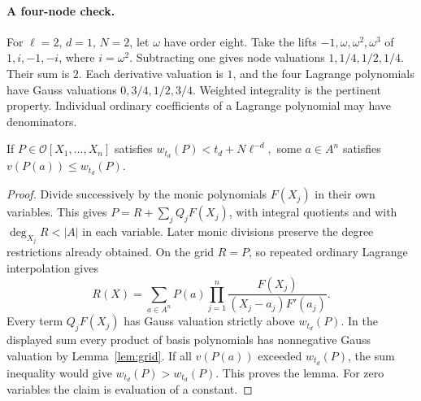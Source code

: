 \documentclass[11pt]{article}
\newcommand{\cO}{\mathcal O}\newcommand{\Tr}{\operatorname{tr}}
\begin{document}
\paragraph{A four-node check.} For $\ell=2$, $d=1$, $N=2$, let $\omega$ have order eight. Take the lifts $-1,\omega,\omega^2,\omega^3$ of $1,i,-1,-i$, where $i=\omega^2$. Subtracting one gives node valuations $1,1/4,1/2,1/4$. Their sum is $2$. Each derivative valuation is $1$, and the four Lagrange polynomials have Gauss valuations $0,3/4,1/2,3/4$. Weighted integrality is the pertinent property. Individual ordinary coefficients of a Lagrange polynomial may have denominators.

\begin{lemma}\label{lem:tensor}
If $P\in\cO[X_1,\ldots,X_n]$ satisfies
\(
 w_{t_d}(P)<t_d+N\ell^{-d},
\)
some $a\in A^n$ satisfies $v(P(a))\le w_{t_d}(P)$.
\end{lemma}
\begin{proof}
Divide successively by the monic polynomials $F(X_j)$ in their own variables. This gives $P=R+\sum_j Q_j F(X_j)$, with integral quotients and with $\deg_{X_j} R<|A|$ in each variable. Later monic divisions preserve the degree restrictions already obtained. On the grid $R=P$, so repeated ordinary Lagrange interpolation gives
\[
 R(X)=\sum_{a\in A^n}P(a)\prod_{j=1}^n
       \frac{F(X_j)}{(X_j-a_j)F'(a_j)}.
\]
Every term $Q_j F(X_j)$ has Gauss valuation strictly above $w_{t_d}(P)$. In the displayed sum every product of basis polynomials has nonnegative Gauss valuation by Lemma~\ref{lem:grid}. If all $v(P(a))$ exceeded $w_{t_d}(P)$, the sum inequality would give $w_{t_d}(P)>w_{t_d}(P)$. This proves the lemma. For zero variables the claim is evaluation of a constant.
\end{proof}
\newpage
\end{document}
